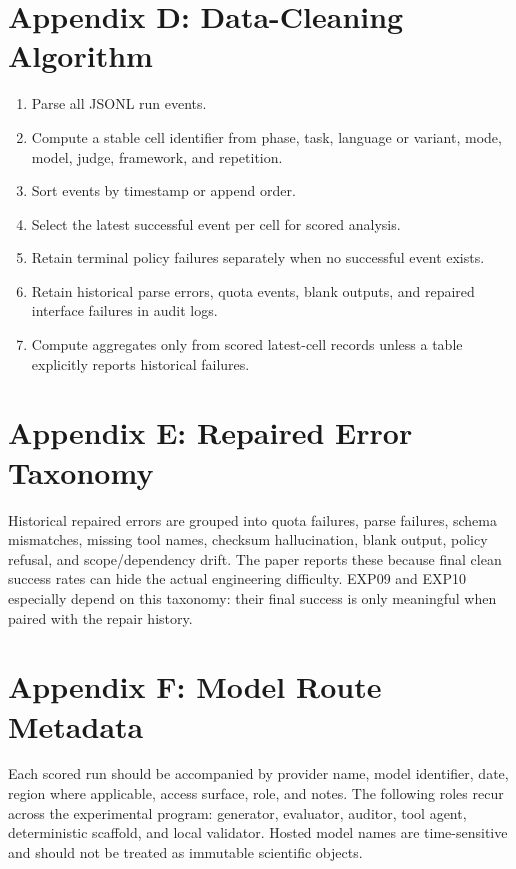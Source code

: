 \documentclass[11pt]{article}
\begin{document}
\section{Appendix D: Data-Cleaning Algorithm}
\begin{enumerate}
\item Parse all JSONL run events.
\item Compute a stable cell identifier from phase, task, language or variant, mode, model, judge, framework, and repetition.
\item Sort events by timestamp or append order.
\item Select the latest successful event per cell for scored analysis.
\item Retain terminal policy failures separately when no successful event exists.
\item Retain historical parse errors, quota events, blank outputs, and repaired interface failures in audit logs.
\item Compute aggregates only from scored latest-cell records unless a table explicitly reports historical failures.
\end{enumerate}

\section{Appendix E: Repaired Error Taxonomy}
Historical repaired errors are grouped into quota failures, parse failures, schema mismatches, missing tool names, checksum hallucination, blank output, policy refusal, and scope/dependency drift. The paper reports these because final clean success rates can hide the actual engineering difficulty. EXP09 and EXP10 especially depend on this taxonomy: their final success is only meaningful when paired with the repair history.

\section{Appendix F: Model Route Metadata}
Each scored run should be accompanied by provider name, model identifier, date, region where applicable, access surface, role, and notes. The following roles recur across the experimental program: generator, evaluator, auditor, tool agent, deterministic scaffold, and local validator. Hosted model names are time-sensitive and should not be treated as immutable scientific objects.
\end{document}
